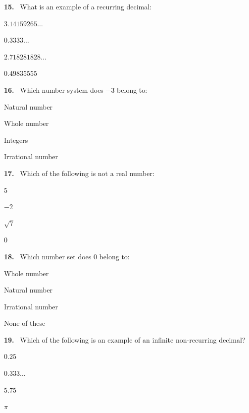 \documentclass[11pt]{article}
\newenvironment{qenv}[1]{%
  \par\medskip\noindent\textbf{#1.}\ \ignorespaces
}{\par}
\begin{document}
\begin{qenv}{15} What is an example of a recurring decimal:
\begin{options} \item $3.14159265\ldots$ \item $0.3333\ldots$ \item $2.718281828\ldots$ \item $0.49835555$ \end{options} \end{qenv}

\begin{qenv}{16} Which number system does $-3$ belong to:
\begin{options} \item Natural number \item Whole number \item Integers \item Irrational number \end{options} \end{qenv}

\begin{qenv}{17} Which of the following is not a real number:
\begin{options} \item $5$ \item $-2$ \item $\sqrt{7}$ \item $0$ \end{options} \end{qenv}

\begin{qenv}{18} Which number set does $0$ belong to:
\begin{options} \item Whole number \item Natural number \item Irrational number \item None of these \end{options} \end{qenv}

\begin{qenv}{19} Which of the following is an example of an infinite non-recurring decimal?
\begin{options} \item $0.25$ \item $0.333\ldots$ \item $5.75$ \item $\pi$ \end{options} \end{qenv}
\end{document}
